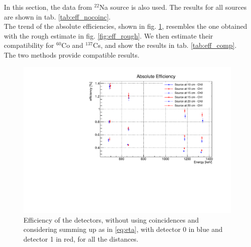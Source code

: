 In this section, the data from $^{22}$Na source is also used. The results for all sources are shown in tab. \ref{tab:eff_nocoinc}. \\
The trend of the absolute efficiencies, shown in fig. \ref{fig:eff_nocoinc}, resembles the one obtained with the rough estimate in fig. \ref{fig:eff_rough}. We then estimate their compatibility for $^{60}$Co and $^{137}$Cs, and show the results in tab. \ref{tab:eff_comp}. The two methods provide compatible results.

\begin{figure}[H]
    \centering
    \includegraphics[scale=0.5]{Images/analysis/efficiency/Eff_nocoinc.pdf}
    \caption{Efficiency of the detectors, without using coincidences and considering summing up as in \ref{eq:eta}, with detector 0 in blue and detector 1 in red, for all the distances.}
    \label{fig:eff_nocoinc}
\end{figure}

